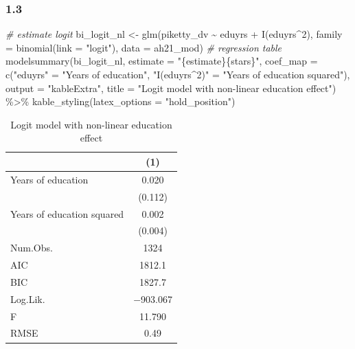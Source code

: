 \documentclass[
]{article}
\newenvironment{Shaded}{\begin{snugshade}}{\end{snugshade}}
\newcommand{\AttributeTok}[1]{\textcolor[rgb]{0.77,0.63,0.00}{#1}}
\newcommand{\CommentTok}[1]{\textcolor[rgb]{0.56,0.35,0.01}{\textit{#1}}}
\newcommand{\DecValTok}[1]{\textcolor[rgb]{0.00,0.00,0.81}{#1}}
\newcommand{\FunctionTok}[1]{\textcolor[rgb]{0.00,0.00,0.00}{#1}}
\newcommand{\NormalTok}[1]{#1}
\newcommand{\OtherTok}[1]{\textcolor[rgb]{0.56,0.35,0.01}{#1}}
\newcommand{\SpecialCharTok}[1]{\textcolor[rgb]{0.00,0.00,0.00}{#1}}
\newcommand{\StringTok}[1]{\textcolor[rgb]{0.31,0.60,0.02}{#1}}
\begin{document}
\hypertarget{section-9}{%
\subsubsection{1.3}\label{section-9}}

\begin{Shaded}
\begin{Highlighting}[]
\CommentTok{\# estimate logit}
\NormalTok{bi\_logit\_nl }\OtherTok{\textless{}{-}} \FunctionTok{glm}\NormalTok{(piketty\_dv }\SpecialCharTok{\textasciitilde{}}\NormalTok{ eduyrs }\SpecialCharTok{+} \FunctionTok{I}\NormalTok{(eduyrs}\SpecialCharTok{\^{}}\DecValTok{2}\NormalTok{), }
                \AttributeTok{family =} \FunctionTok{binomial}\NormalTok{(}\AttributeTok{link =} \StringTok{"logit"}\NormalTok{),}
                \AttributeTok{data =}\NormalTok{ ah21\_mod)}
\CommentTok{\# regression table}
\FunctionTok{modelsummary}\NormalTok{(bi\_logit\_nl,}
             \AttributeTok{estimate =} \StringTok{"\{estimate\}\{stars\}"}\NormalTok{, }
             \AttributeTok{coef\_map =} \FunctionTok{c}\NormalTok{(}\StringTok{"eduyrs"} \OtherTok{=} \StringTok{"Years of education"}\NormalTok{,}
                          \StringTok{"I(eduyrs\^{}2)"} \OtherTok{=} \StringTok{"Years of education squared"}\NormalTok{),}
             \AttributeTok{output =} \StringTok{"kableExtra"}\NormalTok{,}
             \AttributeTok{title =} \StringTok{"Logit model with non{-}linear education effect"}\NormalTok{) }\SpecialCharTok{\%\textgreater{}\%}
  \FunctionTok{kable\_styling}\NormalTok{(}\AttributeTok{latex\_options =} \StringTok{"hold\_position"}\NormalTok{)}
\end{Highlighting}
\end{Shaded}

\begin{table}[!h]

\caption{\label{tab:bi-logit-non-linear}Logit model with non-linear education effect}
\centering
\begin{tabular}[t]{lc}
\toprule
  & (1)\\
\midrule
Years of education & \num{0.020}\\
 & (\num{0.112})\\
Years of education squared & \num{0.002}\\
 & (\num{0.004})\\
\midrule
Num.Obs. & \num{1324}\\
AIC & \num{1812.1}\\
BIC & \num{1827.7}\\
Log.Lik. & \num{-903.067}\\
F & \num{11.790}\\
RMSE & \num{0.49}\\
\bottomrule
\end{tabular}
\end{table}
\end{document}

